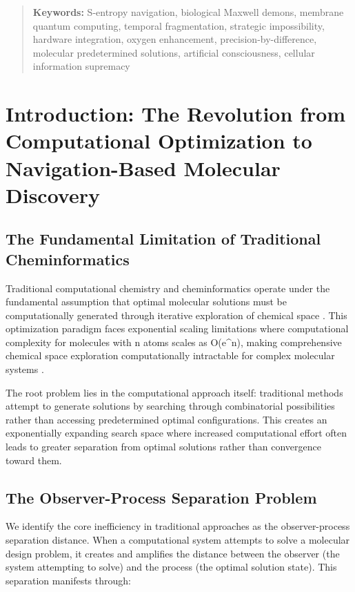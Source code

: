 ﻿\documentclass[11pt,a4paper]{article}
\begin{document}
\begin{abstract}
\textbf{Keywords:} S-entropy navigation, biological Maxwell demons, membrane quantum computing, temporal fragmentation, strategic impossibility, hardware integration, oxygen enhancement, precision-by-difference, molecular predetermined solutions, artificial consciousness, cellular information supremacy

\end{abstract}

\section{Introduction: The Revolution from Computational Optimization to Navigation-Based Molecular Discovery}

\subsection{The Fundamental Limitation of Traditional Cheminformatics}

Traditional computational chemistry and cheminformatics operate under the fundamental assumption that optimal molecular solutions must be computationally generated through iterative exploration of chemical space \cite{reymond2015chemical, walters2020virtual}. This optimization paradigm faces exponential scaling limitations where computational complexity for molecules with n atoms scales as O(e^n), making comprehensive chemical space exploration computationally intractable for complex molecular systems \cite{bohacek1996art}.

The root problem lies in the computational approach itself: traditional methods attempt to generate solutions by searching through combinatorial possibilities rather than accessing predetermined optimal configurations. This creates an exponentially expanding search space where increased computational effort often leads to greater separation from optimal solutions rather than convergence toward them.

\subsection{The Observer-Process Separation Problem}

We identify the core inefficiency in traditional approaches as the observer-process separation distance. When a computational system attempts to solve a molecular design problem, it creates and amplifies the distance between the observer (the system attempting to solve) and the process (the optimal solution state). This separation manifests through:
\end{document}
